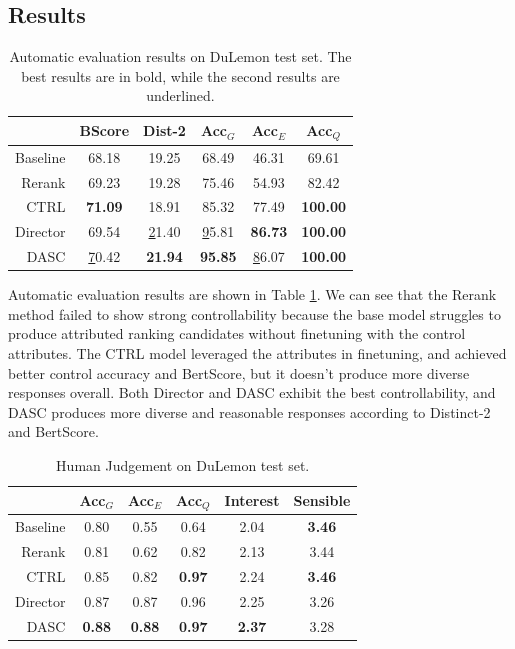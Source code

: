 \subsection{Results}
\label{sec:results}
\begin{table}[]
    \small
    \centering
    \begin{tabular}{rccccc}
    \hline
             & BScore      & Dist-2         & Acc$_G$         & Acc$_E$         & Acc$_Q$          \\ \hline
    Baseline & 68.18          & 19.25          & 68.49          & 46.31          & 69.61           \\
    Rerank   & 69.23          & 19.28          & 75.46          & 54.93          & 82.42           \\
    CTRL     & \textbf{71.09} & 18.91          & 85.32          & 77.49          & \textbf{100.00} \\
    Director & 69.54          & {\ul 21.40}    & {\ul 95.81}    & \textbf{86.73} & \textbf{100.00} \\
    DASC     & {\ul 70.42}    & \textbf{21.94} & \textbf{95.85} & {\ul 86.07}    & \textbf{100.00} \\ \hline
    \end{tabular}
    \caption{Automatic evaluation results on DuLemon test set. The best results are in bold, while the second results are underlined.}
    \label{tab:auto_results}
\end{table}

Automatic evaluation results are shown in Table \ref{tab:auto_results}. We can see that the Rerank method failed to show strong controllability because the base model struggles to produce attributed ranking candidates without finetuning with the control attributes. The CTRL model leveraged the attributes in finetuning, and achieved better control accuracy and BertScore, but it doesn't produce more diverse responses overall. Both Director and DASC exhibit the best controllability, and DASC produces more diverse and reasonable responses according to Distinct-2 and BertScore. 

\begin{table}[]
    \small
    \centering
    \begin{tabular}{rccccc}
    \hline
                & Acc$_G$       & Acc$_E$       & Acc$_Q$  & Interest      & Sensible      \\ \hline
    Baseline & 0.80          & 0.55          & 0.64          & 2.04          & \textbf{3.46} \\
    Rerank   & 0.81          & 0.62          & 0.82          & 2.13          & 3.44          \\
    CTRL     & 0.85          & 0.82          & \textbf{0.97} & 2.24          & \textbf{3.46} \\
    Director & 0.87          & 0.87          & 0.96          & 2.25 & 3.26 \\
    DASC     & \textbf{0.88} & \textbf{0.88} & \textbf{0.97} & \textbf{2.37} & 3.28 \\ \hline
    \end{tabular}
    \caption{Human Judgement on DuLemon test set.}
    \label{tab:human_results}
\end{table}

